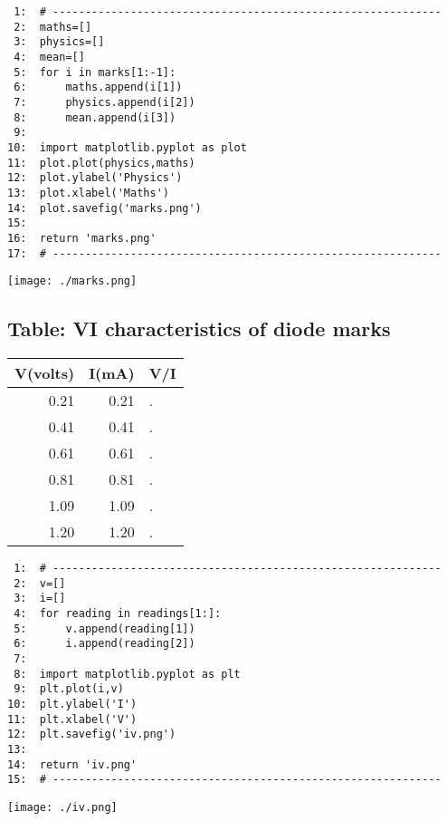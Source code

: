 \documentclass[11pt]{article}
\begin{document}
\begin{verbatim}
 1:  # ------------------------------------------------------------
 2:  maths=[]
 3:  physics=[]
 4:  mean=[]
 5:  for i in marks[1:-1]:
 6:      maths.append(i[1])
 7:      physics.append(i[2])
 8:      mean.append(i[3])
 9:  
10:  import matplotlib.pyplot as plot
11:  plot.plot(physics,maths)
12:  plot.ylabel('Physics')
13:  plot.xlabel('Maths')
14:  plot.savefig('marks.png')
15:  
16:  return 'marks.png'
17:  # ------------------------------------------------------------
\end{verbatim}


\texttt{[image: ./marks.png]}
\subsection{Table: VI characteristics of diode marks}
\label{sec-2-2}


\begin{center}
\begin{tabular}{rrl}
 V(volts)  &  I(mA)  &  V/I  \\
\hline
     0.21  &   0.21  &  .    \\
     0.41  &   0.41  &  .    \\
     0.61  &   0.61  &  .    \\
     0.81  &   0.81  &  .    \\
     1.09  &   1.09  &  .    \\
     1.20  &   1.20  &  .    \\
\hline
\end{tabular}
\end{center}





\begin{verbatim}
 1:  # ------------------------------------------------------------
 2:  v=[]
 3:  i=[]
 4:  for reading in readings[1:]:
 5:      v.append(reading[1])
 6:      i.append(reading[2])
 7:  
 8:  import matplotlib.pyplot as plt
 9:  plt.plot(i,v)
10:  plt.ylabel('I')
11:  plt.xlabel('V')
12:  plt.savefig('iv.png')
13:  
14:  return 'iv.png'
15:  # ------------------------------------------------------------
\end{verbatim}

\texttt{[image: ./iv.png]}
\end{document}
